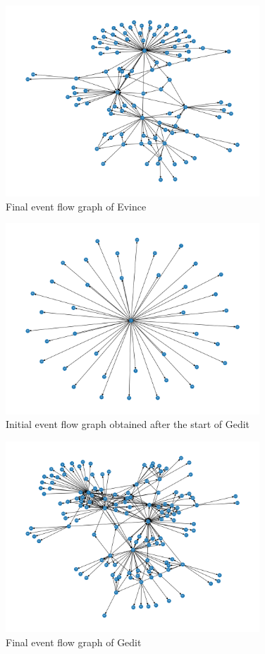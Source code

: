 \begin{figure}[H]
	\centering
	\includegraphics[width=0.85\textwidth,clip]{obrazky-figures/evince_n_final.png}
	\caption{Final event flow graph of Evince}
	\label{evince-graph2}
\end{figure}

\begin{figure}[H]
	\centering
	\includegraphics[width=0.85\textwidth,clip]{obrazky-figures/gedit_n_start.png}
	\caption{Initial event flow graph obtained after the start of Gedit}
	\label{gedit-graph1}
\end{figure}

\begin{figure}[H]
	\centering
	\includegraphics[width=0.85\textwidth,clip]{obrazky-figures/gedit_n_final.png}
	\caption{Final event flow graph of Gedit}
	\label{gedit-graph2}
\end{figure}

